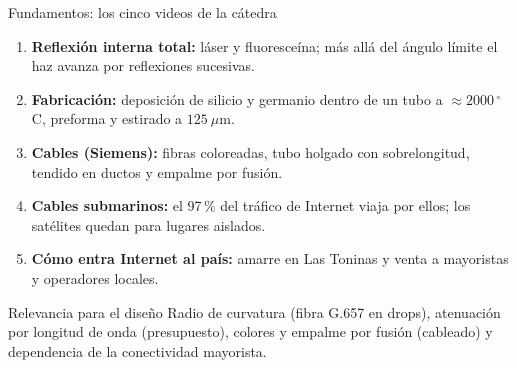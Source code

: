 \begin{frame}{Fundamentos: los cinco videos de la cátedra}
  \small
  \begin{enumerate}
    \item \textbf{Reflexión interna total:} láser y fluoresceína; más allá del ángulo límite el haz avanza por reflexiones sucesivas.
    \item \textbf{Fabricación:} deposición de silicio y germanio dentro de un tubo a $\approx 2000\,^\circ$C, preforma y estirado a $125\ \mu$m.
    \item \textbf{Cables (Siemens):} fibras coloreadas, tubo holgado con sobrelongitud, tendido en ductos y empalme por fusión.
    \item \textbf{Cables submarinos:} el 97\,\% del tráfico de Internet viaja por ellos; los satélites quedan para lugares aislados.
    \item \textbf{Cómo entra Internet al país:} amarre en Las Toninas y venta a mayoristas y operadores locales.
  \end{enumerate}
  \begin{block}{Relevancia para el diseño}
    Radio de curvatura (fibra G.657 en drops), atenuación por longitud de onda (presupuesto), colores y empalme por fusión (cableado) y dependencia de la conectividad mayorista.
  \end{block}
\end{frame}


